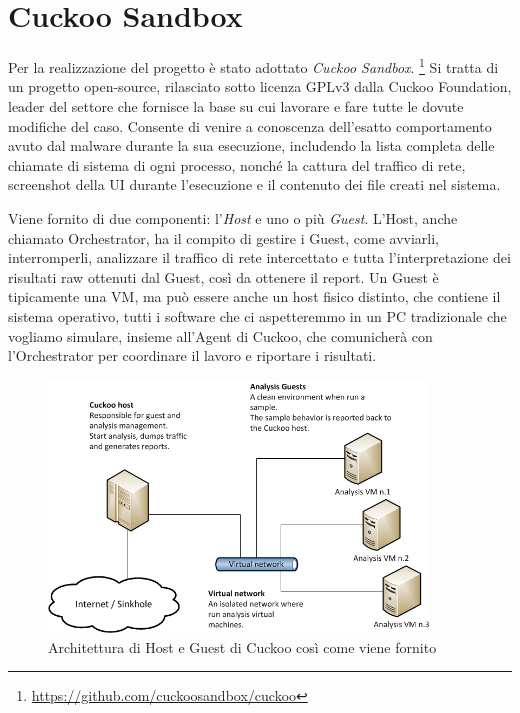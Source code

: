 \section{Cuckoo Sandbox}
Per la realizzazione del progetto è stato adottato \emph{Cuckoo Sandbox}.
\footnote{\url{https://github.com/cuckoosandbox/cuckoo}}
Si tratta di un progetto open-source, rilasciato sotto licenza GPLv3 dalla Cuckoo Foundation, leader del settore che fornisce la base su cui lavorare e fare tutte le dovute modifiche del caso.
Consente di venire a conoscenza dell'esatto comportamento avuto dal malware durante la sua esecuzione, includendo la lista completa delle chiamate di sistema di ogni processo, nonché la cattura del traffico di rete, screenshot della UI durante l'esecuzione e il contenuto dei file creati nel sistema.

Viene fornito di due componenti: l'\emph{Host} e uno o più \emph{Guest}.
L'Host, anche chiamato Orchestrator, ha il compito di gestire i Guest, come avviarli, interromperli, analizzare il traffico di rete intercettato e tutta l'interpretazione dei risultati raw ottenuti dal Guest, così da ottenere il report.
Un Guest è tipicamente una VM, ma può essere anche un host fisico distinto, che contiene il sistema operativo, tutti i software che ci aspetteremmo in un PC tradizionale che vogliamo simulare, insieme all'Agent di Cuckoo, che comunicherà con l'Orchestrator per coordinare il lavoro e riportare i risultati.

\begin{figure}[htbp]
    \centering
    \includegraphics[width=0.9\textwidth]{assets/cuckoo_default_architecture.png}
    \caption{Architettura di Host e Guest di Cuckoo così come viene fornito}
    \label{fig:cuckoo_default_architecture}
\end{figure}


